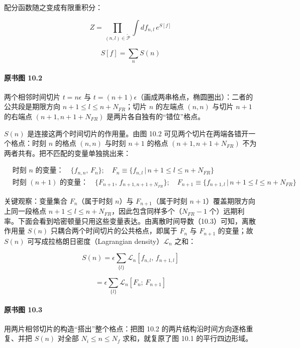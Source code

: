 配分函数随之变成有限重积分：

\begin{equation*}
Z=\prod_{(n,l)\in\widetilde{\mathcal{P}}}\int df_{n,l}\,e^{S[f]}
\tag{10.4}
\end{equation*}

\begin{equation*}
S[f]=\sum_n S(n)
\tag{10.5}
\end{equation*}

\paragraph{原书图 10.2}\quad 两个相邻时间切片 $t=n\epsilon$ 与 $t=(n+1)\epsilon$（画成两串格点，椭圆圈出）：二者的公共段是期限方向 $n+1\le l\le n+N_{FR}$；切片 $n$ 的左端点 $(n,n)$ 与切片 $n+1$ 的右端点 $(n+1,n+1+N_{FR})$ 是两片各自独有的“错位”格点。

$S(n)$ 是连接这两个时间切片的作用量。由图 10.2 可见两个切片在两端各错开一个格点：时刻 $n$ 的格点 $(n,n)$ 与时刻 $n+1$ 的格点 $(n+1,n+1+N_{FR})$ 不为两者共有。把不匹配的变量单独挑出来：

\begin{equation*}
\begin{aligned}
&\text{时刻 } n \text{ 的变量：}\quad \{f_{n,n},\,F_n\};\quad F_n\equiv\{f_{n,l}\,|\,n+1\le l\le n+N_{FR}\}\\
&\text{时刻 } (n+1) \text{ 的变量：}\quad \{F_{n+1},\,f_{n+1,n+1+N_{FR}}\};\quad F_{n+1}\equiv\{f_{n+1,l}\,|\,n+1\le l\le n+N_{FR}\}
\end{aligned}
\tag{10.6}
\end{equation*}

关键观察：变量集合 $F_n$（属于时刻 $n$）与 $F_{n+1}$（属于时刻 $n+1$）覆盖期限方向上同一段格点 $n+1\le l\le n+N_{FR}$，因此包含同样多个（$N_{FR}-1$ 个）远期利率。下面会看到哈密顿量只用这些变量表达。由离散时间导数（10.3）可知，离散作用量 $S(n)$ 只耦合两个时间切片的公共格点，即属于 $F_n$ 与 $F_{n+1}$ 的变量；故 $S(n)$ 可写成拉格朗日密度（Lagrangian density）$\mathcal{L}_n$ 之和：

\begin{equation*}
S(n)=\epsilon\sum_{\{l\}}\mathcal{L}_n[f_{n,l},\,f_{n+1,l}]
\tag{10.7}
\end{equation*}

\begin{equation*}
=\epsilon\sum_{\{l\}}\mathcal{L}_n[F_n;\,F_{n+1}]
\tag{10.8}
\end{equation*}

\paragraph{原书图 10.3}\quad 用两片相邻切片的构造“搭出”整个格点：把图 10.2 的两片结构沿时间方向逐格重复、并把 $S(n)$ 对全部 $N_i\le n\le N_f$ 求和，就复原了图 10.1 的平行四边形域。


